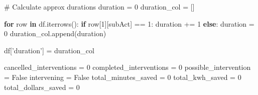\documentclass[11pt,]{article}
\newenvironment{Shaded}{\begin{snugshade}}{\end{snugshade}}
\newcommand{\CommentTok}[1]{\textcolor[rgb]{0.54,0.53,0.53}{#1}}
\newcommand{\ControlFlowTok}[1]{\textcolor[rgb]{0.12,0.11,0.11}{\textbf{#1}}}
\newcommand{\DecValTok}[1]{\textcolor[rgb]{0.69,0.50,0.00}{#1}}
\newcommand{\KeywordTok}[1]{\textcolor[rgb]{0.12,0.11,0.11}{\textbf{#1}}}
\newcommand{\NormalTok}[1]{\textcolor[rgb]{0.12,0.11,0.11}{#1}}
\newcommand{\OperatorTok}[1]{\textcolor[rgb]{0.12,0.11,0.11}{#1}}
\newcommand{\StringTok}[1]{\textcolor[rgb]{0.75,0.01,0.01}{#1}}
\newcommand{\VariableTok}[1]{\textcolor[rgb]{0.00,0.34,0.68}{#1}}
\begin{document}
\begin{Shaded}
\begin{Highlighting}[]
{    \CommentTok{# Calculate approx durations}
\NormalTok{    duration }\OperatorTok{=} \DecValTok{0}
\NormalTok{    duration_col }\OperatorTok{=}\NormalTok{ []}

    \ControlFlowTok{for}\NormalTok{ row }\KeywordTok{in}\NormalTok{ df.iterrows():}
        \ControlFlowTok{if}\NormalTok{ row[}\DecValTok{1}\NormalTok{][subAct] }\OperatorTok{==} \DecValTok{1}\NormalTok{:}
\NormalTok{            duration }\OperatorTok{+=} \DecValTok{1}
        \ControlFlowTok{else}\NormalTok{:}
\NormalTok{            duration }\OperatorTok{=} \DecValTok{0}
\NormalTok{        duration_col.append(duration)}

\NormalTok{    df[}\StringTok{'duration'}\NormalTok{] }\OperatorTok{=}\NormalTok{ duration_col}

\NormalTok{    cancelled_interventions }\OperatorTok{=} \DecValTok{0}
\NormalTok{    completed_interventions }\OperatorTok{=} \DecValTok{0}
\NormalTok{    possible_intervention }\OperatorTok{=} \VariableTok{False}
\NormalTok{    intervening }\OperatorTok{=} \VariableTok{False}
\NormalTok{    total_minutes_saved }\OperatorTok{=} \DecValTok{0}
\NormalTok{    total_kwh_saved }\OperatorTok{=} \DecValTok{0}
\NormalTok{    total_dollars_saved }\OperatorTok{=} \DecValTok{0}

}
\end{Highlighting}
\end{Shaded}
\end{document}
